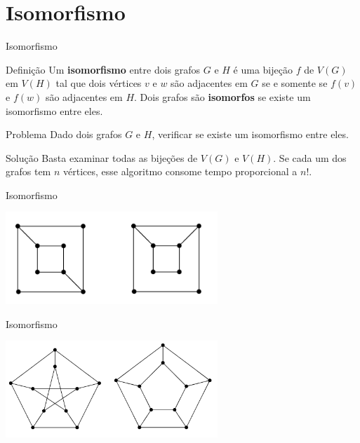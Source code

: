 \documentclass[xcolor=dvipsnames,table]{beamer}
\begin{document}
	\section{Isomorfismo}
	\begin{frame}{Isomorfismo}
		\begin{block}{Definição}
			Um {\bf isomorfismo} entre dois grafos $G$ e $H$ é uma bijeção $f$ de $V(G)$ em $V(H)$ tal que dois vértices $v$ e $w$ são adjacentes em $G$ se e somente se $f(v)$ e $f(w)$ são adjacentes em $H$. Dois grafos são {\bf isomorfos} se existe um isomorfismo entre eles.
		\end{block}
		\pause
		\begin{block}{Problema}
			Dado dois grafos $G$ e $H$, verificar se existe um isomorfismo entre eles.
		\end{block}
		\pause
		\begin{block}{Solução}
			Basta examinar todas as bijeções de $V(G)$ e $V(H)$. Se cada um dos grafos tem $n$ vértices, esse algoritmo consome tempo proporcional a $n!$.
		\end{block}
	\end{frame}
	
	\begin{frame}{Isomorfismo}
		\begin{center}
			\includegraphics[width=8cm]{images/isomorfismo01.png}
		\end{center}
	\end{frame}
	
	\begin{frame}{Isomorfismo}
		\begin{center}
			\includegraphics[width=8cm]{images/isomorfismo02.png}
		\end{center}
	\end{frame}
	
\end{document}
